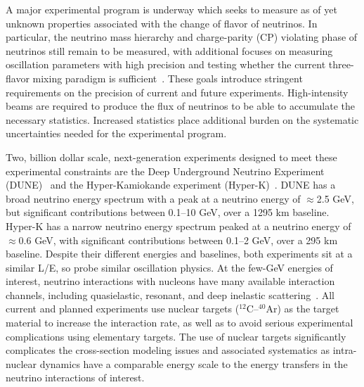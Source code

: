 
A major experimental program is underway which seeks to measure
as of yet unknown properties associated with the change of flavor of neutrinos.
In particular, the neutrino mass hierarchy and charge-parity (CP) violating phase
of neutrinos still remain to be measured, with additional focuses on measuring
oscillation parameters with high precision and testing whether the current
three-flavor mixing paradigm is sufficient~\cite{Esteban:2020cvm, ParticleDataGroup:2020ssz}.
These goals introduce stringent requirements on the precision of current and future experiments.
High-intensity beams are required to produce the flux of neutrinos
 to be able to accumulate the necessary statistics.
Increased statistics place additional burden on the systematic uncertainties needed for the experimental program.

Two, billion dollar scale, next-generation experiments designed to meet these experimental constraints
are the Deep Underground Neutrino Experiment (DUNE)~\cite{Abi:2020wmh}
 and the Hyper-Kamiokande experiment (Hyper-K)~\cite{Hyper-Kamiokande:2018ofw}.
DUNE has a broad neutrino energy spectrum with a peak at a neutrino energy of $\approx$2.5 GeV,
but significant contributions between 0.1--10 GeV, over a 1295 km baseline. Hyper-K has a narrow
neutrino energy spectrum peaked at a neutrino energy of $\approx$0.6 GeV, with significant
contributions between 0.1--2 GeV, over a 295 km baseline. Despite their different energies and
baselines, both experiments sit at a similar L/E, so probe similar oscillation physics.
At the few-GeV energies of interest, neutrino interactions with nucleons have many available interaction channels,
 including quasielastic, resonant, and deep inelastic scattering~\cite{zeller12, hayato_review_2014, Mosel:2016cwa, Katori:2016yel, NuSTEC:2017hzk}.
All current and planned experiments use nuclear targets ($^{12}$C--$^{40}$Ar) as the
target material to increase the interaction rate, as well as to avoid serious experimental complications using elementary targets.
The use of nuclear targets significantly complicates the cross-section modeling issues and
associated systematics as intra-nuclear dynamics have a comparable energy scale to
the energy transfers in the neutrino interactions of interest.

